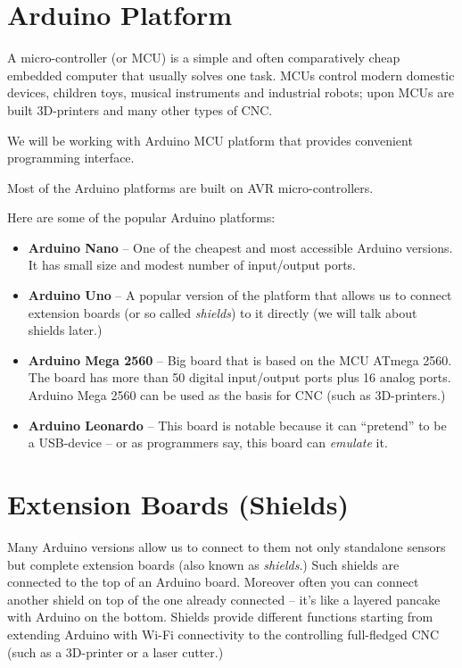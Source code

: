 \documentclass[../sparc.tex]{subfiles}
\begin{document}
\section{Arduino Platform}


A micro-controller (or \gls{MCU}) is a simple and often comparatively cheap
embedded computer that usually solves one task.  MCUs control modern domestic
devices, children toys, musical instruments and industrial robots; upon MCUs are
built 3D-printers and many other types of \gls{CNC}.

We will be working with Arduino MCU platform that provides convenient
programming interface.

Most of the Arduino platforms are built on AVR micro-controllers.

Here are some of the popular Arduino platforms:
\begin{itemize}
\item \textbf{Arduino Nano} -- One of the cheapest and most accessible Arduino
  versions. It has small size and modest number of input/output ports.
\item \textbf{Arduino Uno} -- A popular version of the platform that allows us to
  connect extension boards (or so called \emph{shields}) to it directly (we will
  talk about shields later.)
\item \textbf{Arduino Mega 2560} -- Big board that is based on the MCU ATmega
  2560.  The board has more than 50 digital input/output ports plus 16 analog
  ports.  Arduino Mega 2560 can be used as the basis for CNC (such as
  3D-printers.)
\item \textbf{Arduino Leonardo} -- This board is notable because it can
  ``pretend'' to be a USB-device -- or as programmers say, this board can
  \emph{emulate} it.
\end{itemize}

\section{Extension Boards (Shields)}

Many Arduino versions allow us to connect to them not only standalone sensors
but complete extension boards (also known as \emph{shields}.)  Such shields are
connected to the top of an Arduino board.  Moreover often you can connect
another shield on top of the one already connected -- it's like a layered pancake
with Arduino on the bottom.  Shields provide different functions starting from
extending Arduino with Wi-Fi connectivity to the controlling full-fledged
\gls{CNC} (such as a 3D-printer or a laser cutter.)
\end{document}
